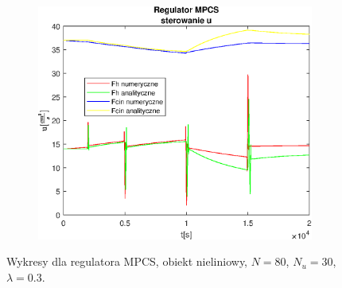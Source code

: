 \begin{figure}[h!]
   \begin{subfigure}[b]{0.4\textwidth}
      \includegraphics[width=1\linewidth]{img/MPCSnumRK/MPCSRKControlN80Nu30l30.eps}
      \caption{}
      \label{fig:fig:MPCSRKN80Nu30l303}
   \end{subfigure}
       
   \caption{Wykresy dla regulatora MPCS, obiekt nieliniowy, $N = 80$, $N_u = 30$, $\lambda = 0.3$.}
   \label{fig:MPCSRKN80Nu30l30}
\end{figure}
           
